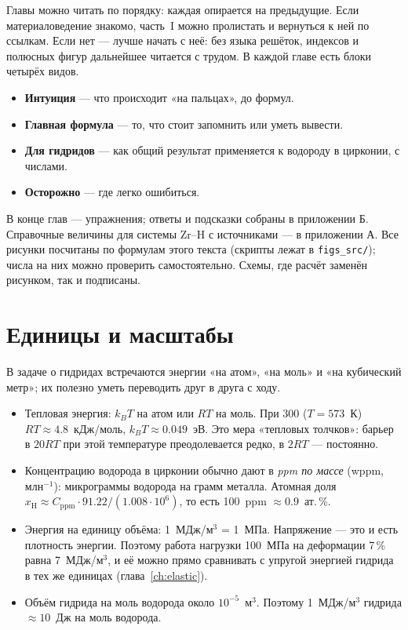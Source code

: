 Главы можно читать по порядку: каждая опирается на предыдущие. Если материаловедение знакомо, часть~I можно
пролистать и вернуться к ней по ссылкам. Если нет --- лучше начать с неё: без языка решёток, индексов и полюсных
фигур дальнейшее читается с трудом. В каждой главе есть блоки четырёх видов.
\begin{itemize}
\item \textbf{\color{circ}Интуиция} --- что происходит «на пальцах», до формул.
\item \textbf{\color{load}Главная формула} --- то, что стоит запомнить или уметь вывести.
\item \textbf{\color{hydr}Для гидридов} --- как общий результат применяется к водороду в цирконии, с числами.
\item \textbf{\color{rad}Осторожно} --- где легко ошибиться.
\end{itemize}
В конце глав --- упражнения; ответы и подсказки собраны в приложении Б. Справочные величины для системы Zr--H
с источниками --- в приложении А. Все рисунки посчитаны по формулам этого текста (скрипты лежат в
\texttt{figs\_src/}); числа на них можно проверить самостоятельно. Схемы, где расчёт заменён рисунком, так и
подписаны.

\section*{Единицы и масштабы}

В задаче о гидридах встречаются энергии «на атом», «на моль» и «на кубический метр»; их полезно уметь переводить
друг в друга с ходу.
\begin{itemize}
\item Тепловая энергия: $k_BT$ на атом или $RT$ на моль. При 300\degC{} ($T = 573$~К)
  $RT \approx 4.8$~кДж/моль, $k_BT \approx 0.049$~эВ. Это мера «тепловых толчков»: барьер в $20RT$ при этой
  температуре преодолевается редко, в $2RT$ --- постоянно.
\item Концентрацию водорода в цирконии обычно дают в \emph{ppm по массе} (wppm, млн$^{-1}$): микрограммы водорода
  на грамм металла. Атомная доля $x_{\mathrm H} \approx C_{\mathrm{ppm}} \cdot 91.22 / (1.008\cdot 10^6)$, то есть
  100~ppm $\approx 0.9$~ат.\,\%.
\item Энергия на единицу объёма: 1~МДж/м$^3$ = 1~МПа. Напряжение --- это и есть плотность энергии. Поэтому
  работа нагрузки 100~МПа на деформации 7\,\% равна 7~МДж/м$^3$, и её можно прямо сравнивать с упругой энергией
  гидрида в тех же единицах (глава~\ref{ch:elastic}).
\item Объём гидрида на моль водорода около $10^{-5}$~м$^3$. Поэтому 1~МДж/м$^3$ гидрида $\approx 10$~Дж на моль водорода.
\end{itemize}
